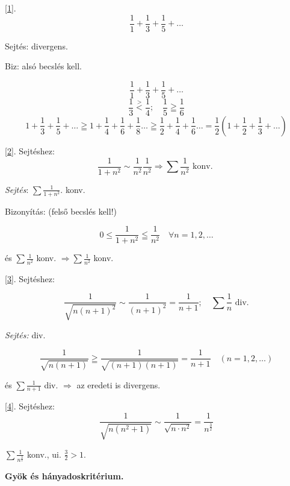 \documentclass[a4paper,11.5pt]{article}
\begin{document}
\begin{enumerate}
	\medskip
	\ref{1}. \[\frac{1}{1}+\frac{1}{3}+\frac{1}{5}+\ldots\]
	
	\medskip
	Sejtés: divergens.
	
	Biz: alsó becslés kell.
	
	\begin{center}
		\[\frac{1}{1}+\frac{1}{3}+\frac{1}{5}+\ldots\]
	\[\frac{1}{3}\stackrel{\displaystyle>}{<}\frac{1}{4} ; \quad \frac{1}{5}\geqq \frac{1}{6}\]
	\[1+\frac{1}{3}+\frac{1}{5}+ \ldots \geqq 1+\frac{1}{4}+\frac{1}{6}+\frac{1}{8}\ldots\geqq \frac{1}{2}+\frac{1}{4}+\frac{1}{6}\ldots=\frac{1}{2}\left(1+\frac{1}{2}+\frac{1}{3}+\ldots \right)\]
	
	\end{center}
	\medskip
	\ref{2}. Sejtéshez: 
	\[\displaystyle\frac{1}{1+n^2} \sim \displaystyle\frac{1}{n^2} \displaystyle\frac{1}{n^2} \Rightarrow \sum \frac{1}{n^2}\text{ konv. } \]
	
	\medskip
	\textit{Sejtés}: $\displaystyle\sum \frac{1}{1+n^2}$. konv.
	
	Bizonyítás: (felső becslés kell!)
	
	\[0\leq \frac{1}{1+n^2} \leqq \frac{1}{n^2} \quad \forall n=1,2,\ldots\]
	
	és $\sum \frac{1}{n^2}$ konv. $\Rightarrow \sum \frac{1}{n^2}$ konv.


\medskip
	\ref{3}. Sejtéshez:
	
	\[ \frac{1}{\sqrt{n(n+1)^2}} \sim \frac{1}{(n+1)^2}=\frac{1}{n+1}; \quad \sum \frac{1}{n} \text{ div} .\]
	
	\medskip
	\textit{Sejtés:} div.
	
	\[\frac{1}{\sqrt{n(n+1)}} \geqq \frac{1}{\sqrt{(n+1)(n+1)}}= \frac{1}{n+1} \quad (n=1,2, \ldots)\]
	
	\medskip
	és $\sum \frac{1}{n+1}$ div.  $\Rightarrow$ az eredeti is divergens.
	
	\ref{4}. Sejtéshez: \[\frac{1}{\sqrt{n(n^2+1)}} \sim \frac{1}{\sqrt{n\cdot n^2}}=\frac{1}{n^{\frac{3}{2}}}\]
	
	$\displaystyle\sum \frac{1}{n^{\frac{3}{2}}}$ konv., ui. $\frac{3}{2}> 1.$
	\end{enumerate}
	\bigskip
	\textbf{Gyök és hányadoskritérium.}
	
\end{document}
